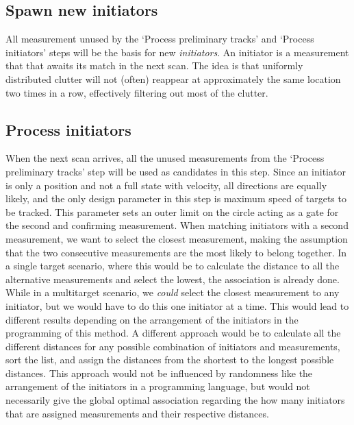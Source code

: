 \subsection{Spawn new initiators}
All measurement unused by the `Process preliminary tracks' and `Process initiators' steps will be the basis for new \emph{initiators}. An initiator is a measurement that that awaits its match in the next scan. The idea is that uniformly distributed clutter will not (often) reappear at approximately the same location two times in a row, effectively filtering out most of the clutter.

\subsection{Process initiators}
When the next scan arrives, all the unused measurements from the `Process preliminary tracks' step will be used as candidates in this step. Since an initiator is only a position and not a full state with velocity, all directions are equally likely, and the only design parameter in this step is maximum speed of targets to be tracked. This parameter sets an outer limit on the circle acting as a gate for the second and confirming measurement. When matching initiators with a second measurement, we want to select the closest measurement, making the assumption that the two consecutive measurements are the most likely to belong together. In a single target scenario, where this would be to calculate the distance to all the alternative measurements and select the lowest, the association is already done. While in a multitarget scenario, we \emph{could} select the closest measurement to any initiator, but we would have to do this one initiator at a time. This would lead to different results depending on the arrangement of the initiators in the programming of this method. A different approach would be to calculate all the different distances for any possible combination of initiators and measurements, sort the list, and assign the distances from the shortest to the longest possible distances. This approach would not be influenced by randomness like the arrangement of the initiators in a programming language, but would not necessarily give the global optimal association regarding the how many initiators that are assigned measurements and their respective distances.

